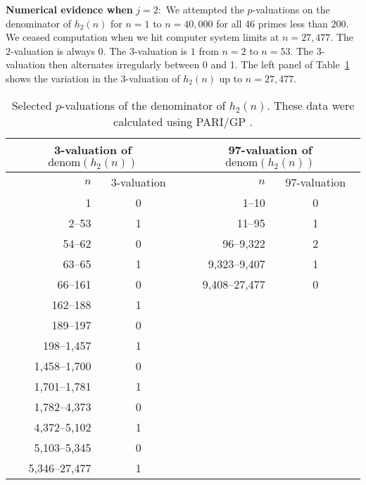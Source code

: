 \documentclass{article}
\theoremstyle{theorem}
\theoremstyle{definition}
\begin{document}
\bigskip

\textbf{Numerical evidence when }$j=2:$ We attempted the $p$-valuations on
the denominator of $h_{2}\left( n\right) $ for $n=1$ to $n=40,000$ for all
46 primes less than $200$. We ceased computation when we hit computer system
limits at $n=27,477.$ The $2$-valuation is always $0$. The $3$-valuation is $%
1 $ from $n=2$ to $n=53$. The $3$-valuation then alternates irregularly
between 0 and 1. The left panel of Table~\ref{tab:p-vals-of-H2} shows the
variation in the 3-valuation of $h_{2}\left( n\right) $ up to $n=27,477$.



\begin{table}[h]\small
\begin{center}
\label{tab:p-vals-of-H2}\centering
\begin{tabular}{rc|rc}
\hline\hline 
\multicolumn{2}{c|}{3-valuation of $\mbox{denom}(h_2\left(n\right))$} & 
\multicolumn{2}{c}{97-valuation of $\mbox{denom}(h_2\left(n\right))$} \\ \hline
$n$ & 3-valuation & $n$ & 97-valuation \\ \hline\hline
1 & 0 & 1--10 & 0 \\ 
2--53 & 1 & 11--95 & 1 \\ 
54--62 & 0 & 96--9,322 & 2 \\ 
63--65 & 1 & 9,323--9,407 & 1 \\ 
66--161 & 0 & 9,408--27,477 & 0 \\ 
162--188 & 1 &  &  \\ 
189--197 & 0 &  &  \\ 
198--1,457 & 1 &  &  \\ 
1,458--1,700 & 0 &  &  \\ 
1,701--1,781 & 1 &  &  \\ 
1,782--4,373 & 0 &  &  \\ 
4,372--5,102 & 1 &  &  \\ 
5,103--5,345 & 0 &  &  \\ 
5,346--27,477 & 1 &  & 
\end{tabular}%
\end{center}
\caption{Selected $p$-valuations of the denominator of $h_2\left(n\right)$. These data were calculated using PARI/GP \cite{Pa}.}
\end{table}
\end{document}
